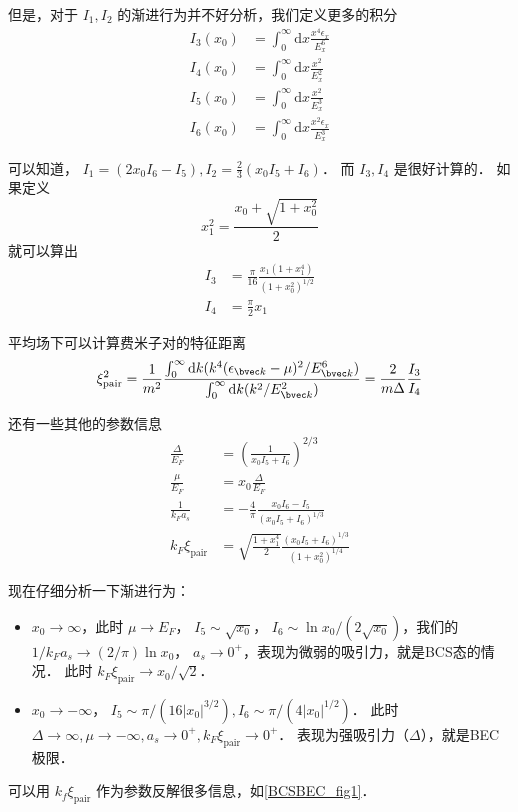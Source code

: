 但是，对于 $I_1, I_2$ 的渐进行为并不好分析，我们定义更多的积分
\begin{align}
I_3(x_0) &=\int_0^\infty\text{d}x\frac{x^4\epsilon_x}{E_x^6}\\
I_4(x_0) &=\int_0^\infty\text{d}x\frac{x^2}{E_x^2}\\
I_5(x_0) &=\int_0^\infty\text{d}x\frac{x^2}{E_x^3}\\
I_6(x_0) &=\int_0^\infty\text{d}x\frac{x^2\epsilon_x}{E_x^3}
\end{align}

可以知道， $I_1=(2x_0I_6-I_5),I_2 = \frac{2}{3}(x_0I_5+I_6)$． 而 $I_3,I_4$ 是很好计算的． 如果定义
\begin{equation}
x_1^2=\frac{x_0+\sqrt{1+x_0^2}}{2}
\end{equation}
就可以算出
\begin{align}
I_3&=\frac{\pi}{16}\frac{x_1(1+x_1^4)}{(1+x_0^2)^{1/2}}\\
I_4&=\frac{\pi}{2}x_1
\end{align}

平均场下可以计算费米子对的特征距离
\begin{equation}
\xi_{\text{pair}}^2 = \frac{1}{m^2}\frac{\int_0^\infty\text{d}k(k^4(\epsilon_{\bvec k}-\mu)^2/E_{\bvec k}^6)}{\int_0^\infty\text{d}k(k^2/E_{\bvec k}^2)} = \frac{2}{m\Delta}\frac{I_3}{I_4}
\end{equation}

还有一些其他的参数信息
\begin{align}
\frac{\Delta}{E_F} &= \left(\frac{1}{x_0I_5+I_6}\right)^{2/3}\\
\frac{\mu}{E_F} &= x_0\frac{\Delta}{E_F} \\
\frac{1}{k_Fa_s} &= -\frac{4}{\pi}\frac{x_0I_6-I_5}{(x_0I_5+I_6)^{1/3}}\\
k_F\xi_{\text{pair}} &= \sqrt{\frac{1+x_1^4}{2}}\frac{(x_0I_5+I_6)^{1/3}}{(1+x_0^2)^{1/4}}
\end{align}

现在仔细分析一下渐进行为：

\begin{itemize}
\item $x_0\to\infty$，此时 $\mu\to E_F$， $I_5\sim\sqrt{x_0}$， $I_6\sim\ln x_0/(2\sqrt{x_0})$，我们的 $1/k_Fa_s\to(2/\pi)\ln x_0$， $a_s\to0^+$，表现为微弱的吸引力，就是BCS态的情况． 此时 $k_F\xi_{\text{pair}}\to x_0/\sqrt2$．
\item $x_0\to-\infty$， $I_5\sim\pi/(16|x_0|^{3/2}), I_6\sim\pi/(4|x_0|^{1/2})$． 此时 $\Delta\to\infty, \mu\to-\infty, a_s\to0^+,k_F\xi_{\text{pair}}\to0^+$． 表现为强吸引力（$\Delta$），就是BEC极限．
\end{itemize}

可以用 $k_f\xi_{\text{pair}}$ 作为参数反解很多信息，如\autoref{BCSBEC_fig1}．


